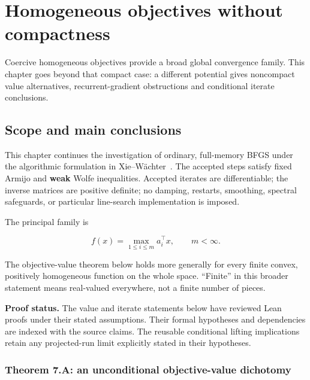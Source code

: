 \chapter{Homogeneous objectives without compactness}\label{comp:H}\label{H:chapter}
\renewcommand{\ModuleTag}{7}
Coercive homogeneous objectives provide a broad global convergence family. This chapter goes beyond that compact case: a different potential gives noncompact value alternatives, recurrent-gradient obstructions and conditional iterate conclusions.


\begingroup

\setcounter{section}{0}
\setcounter{theorem}{0}
\setcounter{lemma}{0}
\setcounter{corollary}{0}
\setcounter{proposition}{0}
\setcounter{remark}{0}
\setcounter{equation}{0}


\section{Scope and main
conclusions}\label{H:scope-and-main-conclusions}

This chapter continues the investigation of ordinary, full-memory BFGS
under the algorithmic formulation in Xie--W\"achter~\cite{XW}. The accepted
steps satisfy fixed Armijo and \textbf{weak} Wolfe inequalities.
Accepted iterates are differentiable; the inverse matrices are positive
definite; no damping, restarts, smoothing, spectral safeguards, or
particular line-search implementation is imposed.

The principal family is

\[
f(x)=\max_{1\le i\le m}a_i^\top x,\qquad m<\infty.
\]

The objective-value theorem below holds more generally for every finite
convex, positively homogeneous function on the whole space. ``Finite''
in this broader statement means real-valued everywhere, not a finite
number of pieces.

\textbf{Proof status.} The value and iterate statements below have reviewed Lean proofs under their stated assumptions. Their formal hypotheses and dependencies are indexed with the source claims. The reusable conditional lifting implications retain any projected-run limit explicitly stated in their hypotheses.



\subsection{Theorem 7.A: an unconditional objective-value
dichotomy}\label{H:theorem-a-an-unconditional-objective-value-dichotomy}

